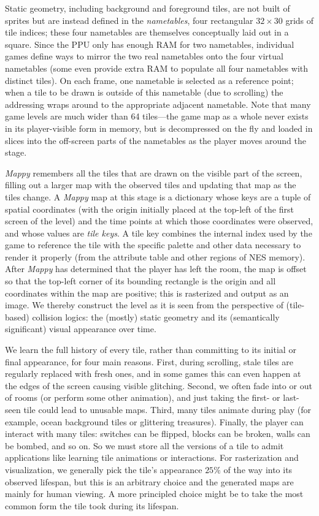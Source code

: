 \documentclass[12pt]{report}
\begin{document}
Static geometry, including background and foreground tiles, are not built of sprites but are instead defined in the \emph{nametables}, four rectangular \(32 \times 30\) grids of tile indices; these four nametables are themselves conceptually laid out in a square.
Since the PPU only has enough RAM for two nametables, individual games define ways to mirror the two real nametables onto the four virtual nametables (some even provide extra RAM to populate all four nametables with distinct  tiles).
On each frame, one nametable is selected as a reference point; when a tile to be drawn is outside of this nametable (due to scrolling) the addressing wraps around to the appropriate adjacent nametable.
Note that many game levels are much wider than 64 tiles---the game map as a whole never exists in its player-visible form in memory, but is decompressed on the fly and loaded in slices into the off-screen parts of the nametables as the player moves around the stage.

\emph{Mappy} remembers all the tiles that are drawn on the visible part of the screen, filling out a larger map with the observed tiles and updating that map as the tiles change.
A \emph{Mappy} map at this stage is a dictionary whose keys are a tuple of spatial coordinates (with the origin initially placed at the top-left of the first screen of the level) and the time points at which those coordinates were observed, and whose values are \emph{tile keys}.
A tile key combines the internal index used by the game to reference the tile with the specific palette and other data necessary to render it properly (from the attribute table and other regions of NES memory).
After \emph{Mappy} has determined that the player has left the room, the map is offset so that the top-left corner of its bounding rectangle is the origin and all coordinates within the map are positive; this is rasterized and output as an image.
We thereby construct the level as it is seen from the perspective of (tile-based) collision logics: the (mostly) static geometry and its (semantically significant) visual appearance over time.

We learn the full history of every tile, rather than committing to its initial or final appearance, for four main reasons.
First, during scrolling, stale tiles are regularly replaced with fresh ones, and in some games this can even happen at the edges of the screen causing visible glitching.
Second, we often fade into or out of rooms (or perform some other animation), and just taking the first- or last- seen tile could lead to unusable maps.
Third, many tiles animate during play (for example, ocean background tiles or glittering treasures).
Finally, the player can interact with many tiles: switches can be flipped, blocks can be broken, walls can be bombed, and so on.
So we must store all the versions of a tile to admit applications like learning tile animations or interactions.
For rasterization and visualization, we generally pick the tile's appearance $25\%$ of the way into its observed lifespan, but this is an arbitrary choice and the generated maps are mainly for human viewing.
A more principled choice might be to take the most common form the tile took during its lifespan.
\end{document}

